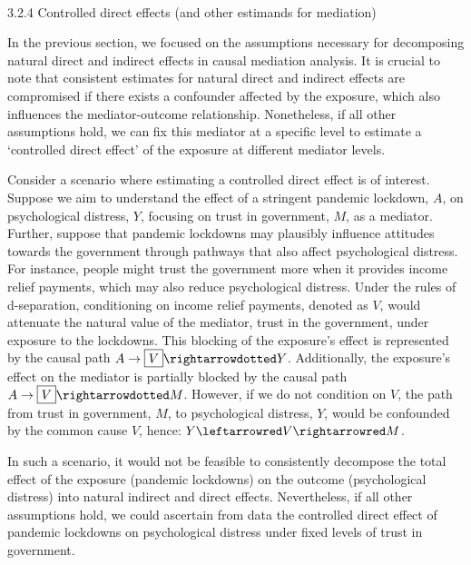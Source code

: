 \documentclass[
  single column]{article}
\makeatletter
\let\oldparagraph\paragraph
\renewcommand{\paragraph}{
    \@ifstar
      \xxxParagraphStar
      \xxxParagraphNoStar
  }
\newcommand{\xxxParagraphStar}[1]{\oldparagraph*{#1}\mbox{}}
\newcommand{\xxxParagraphNoStar}[1]{\oldparagraph{#1}\mbox{}}
\makeatother
\begin{document}
\paragraph{3.2.4 Controlled direct effects (and other estimands for
mediation)}\label{controlled-direct-effects-and-other-estimands-for-mediation}

In the previous section, we focused on the assumptions necessary for
decomposing natural direct and indirect effects in causal mediation
analysis. It is crucial to note that consistent estimates for natural
direct and indirect effects are compromised if there exists a confounder
affected by the exposure, which also influences the mediator-outcome
relationship. Nonetheless, if all other assumptions hold, we can fix
this mediator at a specific level to estimate a `controlled direct
effect' of the exposure at different mediator levels.

Consider a scenario where estimating a controlled direct effect is of
interest. Suppose we aim to understand the effect of a stringent
pandemic lockdown, \(A\), on psychological distress, \(Y\), focusing on
trust in government, \(M\), as a mediator. Further, suppose that
pandemic lockdowns may plausibly influence attitudes towards the
government through pathways that also affect psychological distress. For
instance, people might trust the government more when it provides income
relief payments, which may also reduce psychological distress. Under the
rules of d-separation, conditioning on income relief payments, denoted
as \(V\), would attenuate the natural value of the mediator, trust in
the government, under exposure to the lockdowns. This blocking of the
exposure's effect is represented by the causal path
\(A \to \boxed{V} \rightarrowdotted Y\). Additionally, the exposure's
effect on the mediator is partially blocked by the causal path
\(A \to \boxed{V} \rightarrowdotted M\). However, if we do not condition
on \(V\), the path from trust in government, \(M\), to psychological
distress, \(Y\), would be confounded by the common cause \(V\), hence:
\(Y \leftarrowred V \rightarrowred M\).

In such a scenario, it would not be feasible to consistently decompose
the total effect of the exposure (pandemic lockdowns) on the outcome
(psychological distress) into natural indirect and direct effects.
Nevertheless, if all other assumptions hold, we could ascertain from
data the controlled direct effect of pandemic lockdowns on psychological
distress under fixed levels of trust in government.
\end{document}

